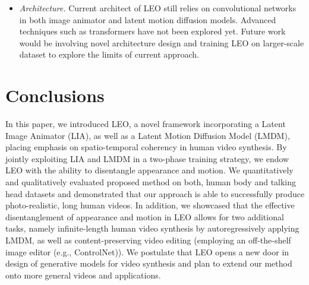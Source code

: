 \begin{itemize}
\item \textit{Architecture.} Current architect of LEO still relies on convolutional networks in both image animator and latent motion diffusion models. Advanced techniques such as transformers have not been explored yet. Future work would be involving novel architecture design and training LEO on larger-scale dataset to explore the limits of current approach.
\end{itemize}

\section{Conclusions}
In this paper, we introduced LEO, a novel framework incorporating a Latent Image Animator (LIA), as well as a Latent Motion Diffusion Model (LMDM), placing emphasis on spatio-temporal coherency in human video synthesis. By jointly exploiting LIA and LMDM in a two-phase training strategy, we endow LEO with the ability to disentangle appearance and motion. We quantitatively and qualitatively evaluated proposed method on both, human body and talking head datasets and demonstrated that our approach is able to successfully produce photo-realistic, long human videos. In addition, we showcased that the effective disentanglement of appearance and motion in LEO allows for two additional tasks, namely infinite-length human video synthesis by autoregressively applying LMDM, as well as content-preserving video editing (employing an off-the-shelf image editor (e.g., ControlNet)). We postulate that LEO opens a new door in design of generative models for video synthesis and plan to extend our method onto more general videos and applications.

